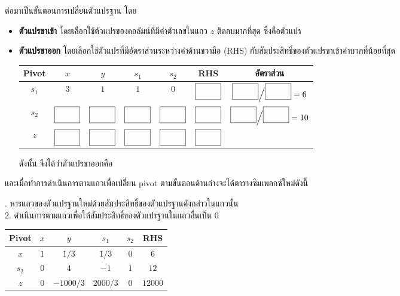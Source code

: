 ต่อมาเป็นขั้นตอนการเปลี่ยนตัวแปรฐาน โดย
\begin{itemize}
    \item \textbf{ตัวแปรขาเข้า} โดยเลือกใช้ตัวแปรของคอลัมน์ที่มีค่าตัวเลขในแถว $z$ ติดลบมากที่สุด ซึ่งคือตัวแปร \blank[]{1cm}
    \item \textbf{ตัวแปรขาออก} โดยเลือกใช้ตัวแปรที่มีอัตราส่วนระหว่างค่าด้านขวามือ (RHS) กับสัมประสิทธิ์ของตัวแปรขาเข้าค่าบวกที่น้อยที่สุด
    \begin{center}
        \begin{tabular}{|c|cccc|c|c|}
            \hline
            \textbf{Pivot} & $x$ & $y$ &  $s_1$ & $s_2$ &  \textbf{RHS} & อัตราส่วน \\
            \hline
            $s_1$ & $3$ & $1$  & $1$ & $0$ & $\blank[]{0.5cm}$ & $\blank[]{0.5cm} {\Big /} \blank[]{0.5cm} = 6$ \\
            $s_2$ & $\blank[]{0.5cm}$ & $\blank[]{0.5cm}$  & $\blank[]{0.5cm}$ & $\blank[]{0.5cm}$ & $\blank[]{0.5cm}$ & $\blank[]{0.5cm} {\Big /} \blank[]{0.5cm} = 10$ \\
            \hline
            $z$   & $\blank[]{0.5cm}$ & $\blank[]{0.5cm}$  & $\blank[]{0.5cm}$ & $\blank[]{0.5cm}$ & $\blank[]{0.5cm}$ & \\
            \hline
        \end{tabular}
    \end{center}
    ดังนั้น จึงได้ว่าตัวแปรขาออกคือ \blank[]{1cm}
\end{itemize}
และเมื่อทำการดำเนินการตามแถวเพื่อเปลี่ยน pivot ตามขั้นตอนด้านล่างจะได้ตารางซิมเพลกซ์ใหม่ดังนี้
\begin{multicols}{2}
. หารแถวของตัวแปรฐานใหม่ด้วยสัมประสิทธิ์ของตัวแปรฐานดังกล่าวในแถวนั้น\\
2. ดำเนินการตามแถวเพื่อให้สัมประสิทธิ์ของตัวแปรฐานในแถวอื่นเป็น 0\\
\begin{tabular}{|c|cccc|c|}
    \hline
    \textbf{Pivot} & $x$ & $y$ &  $s_1$ & $s_2$ &  \textbf{RHS}  \\
    \hline
    $x$ & $1$ & $1/3$  & $1/3$ & $0$ & $6$ \\
    $s_2$ & $0$ & $4$  & $-1$ & $1$ & $12$ \\
    \hline
    $z$   & $0$ & $-1000/3$  & $2000/3$ & $0$ & $12000$ \\
    \hline
\end{tabular}
\end{multicols}

